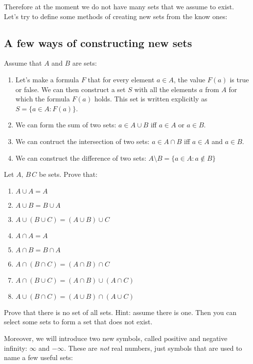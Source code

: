 Therefore at the moment we do not have many sets that we assume to exist. Let's try to define some methods of creating new sets from the know ones:

\subsection{A few ways of constructing new sets}
\noindent Assume that $A$ and $B$ are sets:
\begin{enumerate}
	\item Let's make a formula $F$ that for every element $a\in A$, the value
		$F(a)$ is true or false. We can then construct a set $S$ with all the elements $a$ from $A$ for which
		the formula $F(a)$ holds. This set is written explicitly as $S=\{a\in A : F(a)\}$.
	\item We can form the sum of two sets: $a \in A\cup B$ iff $a\in A$ or $a\in B$.
	\item We can contruct the intersection of two sets: $a\in A\cap B$ iff $a\in A$ and $a \in B$.
	\item We can construct the difference of two sets: $A\setminus B = \{a \in A : a\notin B\}$
\end{enumerate}

\begin{prob}
	Let $A,\,B\,C$ be sets. Prove that:
	\begin{enumerate}
		\item $A\cup A=A$
		\item $A\cup B=B\cup A$
		\item $A\cup (B\cup C)=(A\cup B)\cup C$
		\item $A\cap A=A$
		\item $A\cap B=B\cap A$
		\item $A\cap (B\cap C)=(A\cap B)\cap C$
		\item $A\cap (B\cup C)=(A\cap B)\cup (A\cap C)$
		\item $A\cup (B\cap C)=(A\cup B)\cap (A\cup C)$
	\end{enumerate}
\end{prob}

\begin{prob}
	Prove that there is no set of all sets. Hint: assume there is one. Then you can select some sets to form a set that does not exist.
\end{prob}

\noindent Moreover, we will introduce two new symbols, called positive and negative infinity:
$\infty$ and $-\infty$.
These are \textit{not} real numbers, just symbols that are used to name a few useful sets:

